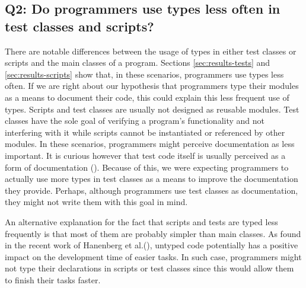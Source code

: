 \documentclass[msc]{ppgccufmg}
\begin{document}

\subsection*{Q2: Do programmers use types less often in test classes and scripts?\label{discussion-q2}}
There are notable differences between the usage of types in either test classes or scripts and the main classes of a program.
Sections \ref{sec:results-tests} and \ref{sec:results-scripts} show that, in these scenarios, programmers use types less often.
If we are right about our hypothesis that programmers type their modules as a means to document their code, this could explain this less frequent use of types.
Scripts and test classes are usually not designed as reusable modules.
Test classes have the sole goal of verifying a program's functionality and not interfering with it while scripts cannot be instantiated or referenced by other modules.
In these scenarios, programmers might perceive documentation as less important.
It is curious however that test code itself is usually perceived as a form of documentation (\cite{Beck03,Meyerovich13}).
Because of this, we were expecting programmers to actually use more types in test classes as a means to improve the documentation they provide.
Perhaps, although programmers use test classes as documentation, they might not write them with this goal in mind.

An alternative explanation for the fact that scripts and tests are typed less frequently is that most of them are probably simpler than main classes.
As found in the recent work of Hanenberg et al.(\cite{Hanenberg13}), untyped code potentially has a positive impact on the development time of easier tasks.
In such case, programmers might not type their declarations in scripts or test classes since this would allow them to finish their tasks faster.

\end{document}
